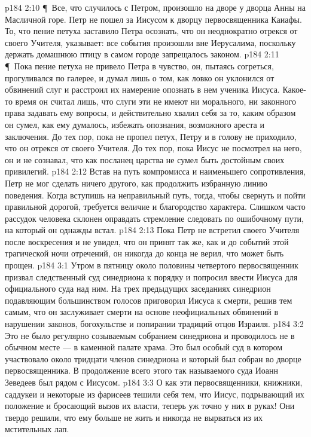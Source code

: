 \vs p184 2:10 \P\ Все, что случилось с Петром, произошло на дворе у дворца Анны на Масличной горе. Петр не пошел за Иисусом к дворцу первосвященника Каиафы. То, что пение петуха заставило Петра осознать, что он неоднократно отрекся от своего Учителя, указывает: все события произошли вне Иерусалима, поскольку держать домашнюю птицу в самом городе запрещалось законом.
\vs p184 2:11 \P\ Пока пение петуха не привело Петра в чувство, он, пытаясь согреться, прогуливался по галерее, и думал лишь о том, как ловко он уклонился от обвинений слуг и расстроил их намерение опознать в нем ученика Иисуса. Какое\hyp{}то время он считал лишь, что слуги эти не имеют ни морального, ни законного права задавать ему вопросы, и действительно хвалил себя за то, каким образом он сумел, как ему думалось, избежать опознания, возможного ареста и заключения. До тех пор, пока не пропел петух, Петру и в голову не приходило, что он отрекся от своего Учителя. До тех пор, пока Иисус не посмотрел на него, он и не сознавал, что как посланец царства не сумел быть достойным своих привилегий.
\vs p184 2:12 Встав на путь компромисса и наименьшего сопротивления, Петр не мог сделать ничего другого, как продолжить избранную линию поведения. Когда вступишь на неправильный путь, тогда, чтобы свернуть и пойти правильной дорогой, требуется величие и благородство характера. Слишком часто рассудок человека склонен оправдать стремление следовать по ошибочному пути, на который он однажды встал.
\vs p184 2:13 Пока Петр не встретил своего Учителя после воскресения и не увидел, что он принят так же, как и до событий этой трагической ночи отречений, он никогда до конца не верил, что может быть прощен.
\vs p184 3:1 Утром в пятницу около половины четвертого первосвященник призвал следственный суд синедриона к порядку и попросил ввести Иисуса для официального суда над ним. На трех предыдущих заседаниях синедрион подавляющим большинством голосов приговорил Иисуса к смерти, решив тем самым, что он заслуживает смерти на основе неофициальных обвинений в нарушении законов, богохульстве и попирании традиций отцов Израиля.
\vs p184 3:2 Это не было регулярно созываемым собранием синедриона и проводилось не в обычном месте --- в каменной палате храма. Это был особый суд в котором участвовало около тридцати членов синедриона и который был собран во дворце первосвященника. В продолжение всего этого так называемого суда Иоанн Зеведеев был рядом с Иисусом.
\vs p184 3:3 О как эти первосвященники, книжники, саддукеи и некоторые из фарисеев тешили себя тем, что Иисус, подрывающий их положение и бросающий вызов их власти, теперь уж точно у них в руках! Они твердо решили, что ему больше не жить и никогда не вырваться из их мстительных лап.
